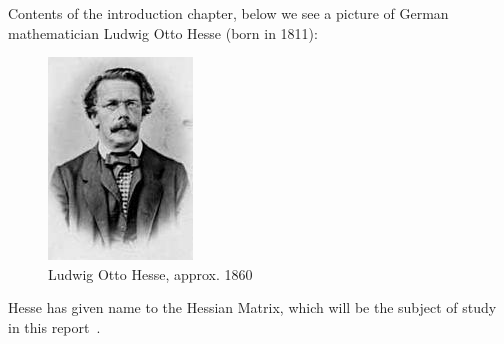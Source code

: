 \documentclass[../convex_optimization.tex]{subfiles}
\begin{document}
Contents of the introduction chapter, below we see a picture of German
mathematician Ludwig Otto Hesse (born in 1811):

\begin{figure}[H]
    \begin{center}
        \includegraphics[width=0.5\linewidth]{figures/ludwig_otto_hesse.jpg}
        \caption{Ludwig Otto Hesse, approx. 1860}
        \label{fig:hesse_picture}
    \end{center}
\end{figure}
Hesse has given name to the Hessian Matrix, which will be the subject of study
in this report~\cite{hessian_wiki}.
\end{document}
